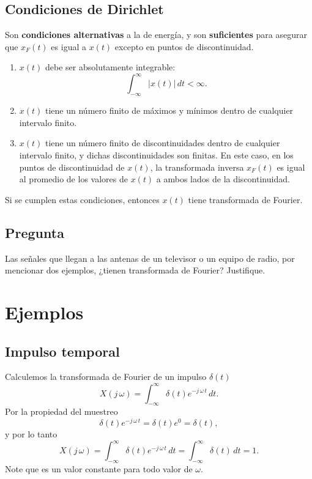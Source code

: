 \documentclass[11pt,a4paper,openany]{book}
\begin{document}
\subsection{Condiciones de Dirichlet}

Son \textbf{condiciones alternativas} a la de energía, y son \textbf{suficientes} para asegurar que $x_{F}(t)$ es igual a $x(t)$ excepto en puntos de discontinuidad.
\begin{enumerate}
	\item $x(t)$ debe ser absolutamente integrable:
	\begin{equation}
		\int_{-\infty}^{\infty} |x(t)| \, dt < \infty .
	\end{equation}
	
	\item $x(t)$ tiene un número finito de máximos y mínimos dentro de cualquier intervalo finito.
	\item $x(t)$ tiene un número finito de discontinuidades dentro de cualquier intervalo finito, y dichas discontinuidades son finitas. En este caso, en los puntos de discontinuidad de $x(t)$, la transformada inversa $x_{F}(t)$ es igual al promedio de los valores de $x(t)$ a ambos lados de la discontinuidad.
\end{enumerate}
Si se cumplen estas condiciones, entonces $x(t)$ tiene transformada de Fourier.

\subsection{Pregunta}

Las señales que llegan a las antenas de un televisor o un equipo de radio, por mencionar dos ejemplos, ¿tienen transformada de Fourier? Justifique.

\section{Ejemplos}

\subsection{Impulso temporal}

Calculemos la transformada de Fourier de un impulso $\delta(t)$
\begin{equation}
	X(j \, \omega) = \int_{-\infty}^{\infty} \delta(t) e^{-j \, \omega \, t} \, dt.
\end{equation}
Por la propiedad del muestreo 
\begin{equation}
	\delta(t) e^{-j \, \omega \, t} = \delta(t) e^{0} = \delta(t) ,
\end{equation}
y por lo tanto 
\begin{equation}
	X(j \, \omega) = \int_{-\infty}^{\infty} \delta(t) e^{-j \, \omega \, t} \, dt = \int_{-\infty}^{\infty} \delta(t) \, dt = 1.
\end{equation}
Note que es un valor constante para todo valor de $\omega.$
\end{document}
